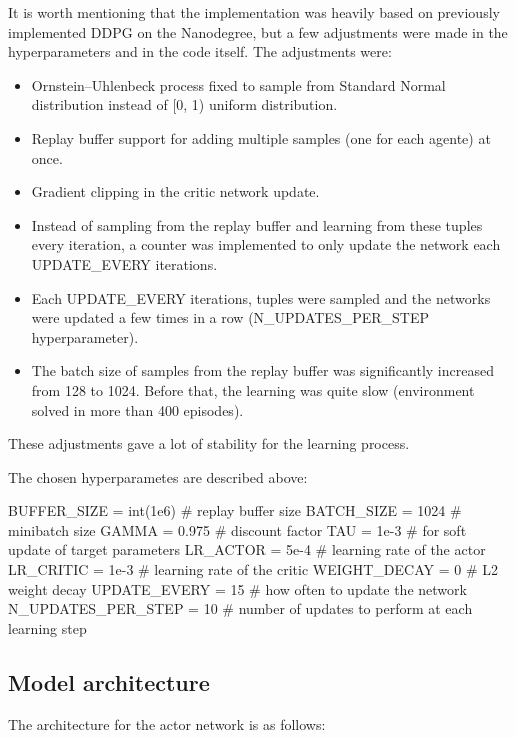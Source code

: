 \documentclass{article}
\begin{document}
It is worth mentioning that the implementation was heavily based on previously implemented DDPG on the Nanodegree, but a few adjustments were made in the hyperparameters and in the code itself. The adjustments were:

\begin{itemize}
    \item Ornstein–Uhlenbeck process fixed to sample from Standard Normal distribution instead of [0, 1) uniform distribution.
    \item Replay buffer support for adding multiple samples (one for each agente) at once.
    \item Gradient clipping in the critic network update.
    \item Instead of sampling from the replay buffer and learning from these tuples every iteration, a counter was implemented to only update the network each UPDATE\_EVERY iterations.
    \item Each UPDATE\_EVERY iterations, tuples were sampled and the networks were updated a few times in a row (N\_UPDATES\_PER\_STEP hyperparameter).
    \item The batch size of samples from the replay buffer was significantly increased from 128 to 1024. Before that, the learning was quite slow (environment solved in more than 400 episodes).
\end{itemize}

These adjustments gave a lot of stability for the learning process.

The chosen hyperparametes are described above:

\begin{code}[Python]
BUFFER_SIZE = int(1e6)    # replay buffer size
BATCH_SIZE = 1024         # minibatch size
GAMMA = 0.975             # discount factor
TAU = 1e-3                # for soft update of target parameters
LR_ACTOR = 5e-4           # learning rate of the actor
LR_CRITIC = 1e-3          # learning rate of the critic
WEIGHT_DECAY = 0          # L2 weight decay
UPDATE_EVERY = 15         # how often to update the network
N_UPDATES_PER_STEP = 10   # number of updates to perform at each learning step
\end{code}

\subsection{Model architecture}

The architecture for the actor network is as follows:
\end{document}
